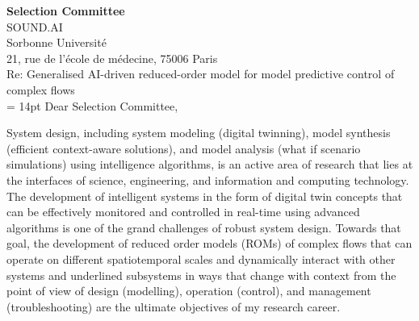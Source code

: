 \documentclass[oneside,11pt,a4paper]{article}
\begin{document}
{\textbf{Selection Committee}}\\[-1mm]
{{\scriptsize{SOUND.AI}}\\[1mm]
Sorbonne Université\\[-1mm]
21, rue de l'école de médecine, 75006 Paris}\\[8mm]
Re: Generalised AI-driven reduced-order model for model predictive control of complex flows\\[8mm]
\baselineskip = 14pt
\setlength{\parskip}{10pt}
Dear Selection Committee,


System design, including system modeling (digital twinning), model synthesis (efficient context-aware solutions), and model analysis (what if scenario simulations) using intelligence algorithms, is an active area of research that lies at the interfaces of science, engineering, and information and computing technology. The development of intelligent systems in the form of digital twin concepts that can be effectively monitored and controlled in real-time using advanced algorithms is one of the grand challenges of robust system design. Towards that goal, the development of reduced order models (ROMs) of complex flows that can operate on different spatiotemporal scales and dynamically interact with other systems and underlined subsystems in ways that change with context from the point of view of design (modelling), operation (control), and management (troubleshooting) are the ultimate objectives of my research career.
\end{document}
